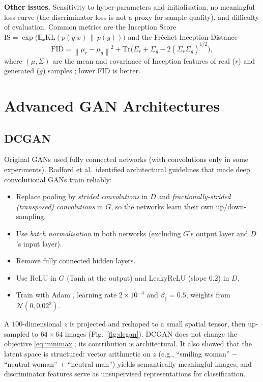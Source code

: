 \documentclass[conference]{IEEEtran}
\newcommand{\E}{\mathbb{E}}
\newcommand{\KL}{\mathrm{KL}}
\newcommand{\norm}[1]{\left\lVert #1 \right\rVert}
\theoremstyle{plain}
\theoremstyle{definition}
\begin{document}
\textbf{Other issues.} Sensitivity to hyper-parameters and initialisation, no meaningful loss curve (the discriminator loss is not a proxy for sample quality), and difficulty of evaluation. Common metrics are the Inception Score $\mathrm{IS}=\exp\big(\E_x\KL(p(y|x)\,\|\,p(y))\big)$ \cite{salimans2016improved} and the Fr\'echet Inception Distance
\begin{equation}
\mathrm{FID}=\norm{\mu_r-\mu_g}^2+\mathrm{Tr}\big(\Sigma_r+\Sigma_g-2(\Sigma_r\Sigma_g)^{1/2}\big),
\end{equation}
where $(\mu,\Sigma)$ are the mean and covariance of Inception features of real ($r$) and generated ($g$) samples \cite{heusel2017ttur}; lower FID is better.

\section{Advanced GAN Architectures}\label{sec:arch}

\subsection{DCGAN \cite{radford2016dcgan}}
Original GANs used fully connected networks (with convolutions only in some experiments). Radford et al.\ identified architectural guidelines that made deep convolutional GANs train reliably:
\begin{itemize}
\item Replace pooling by \emph{strided convolutions} in $D$ and \emph{fractionally-strided (transposed) convolutions} in $G$, so the networks learn their own up/down-sampling.
\item Use \emph{batch normalisation} \cite{ioffe2015bn} in both networks (excluding $G$'s output layer and $D$'s input layer).
\item Remove fully connected hidden layers.
\item Use ReLU in $G$ (Tanh at the output) and LeakyReLU (slope $0.2$) in $D$.
\item Train with Adam \cite{kingma2015adam}, learning rate $2\times10^{-4}$ and $\beta_1=0.5$; weights from $\mathcal{N}(0,0.02^2)$.
\end{itemize}
A $100$-dimensional $z$ is projected and reshaped to a small spatial tensor, then up-sampled to $64\times64$ images (Fig.~\ref{fig:dcgan}). DCGAN does not change the objective \eqref{eq:minimax}; its contribution is architectural. It also showed that the latent space is structured: vector arithmetic on $z$ (e.g., ``smiling woman'' $-$ ``neutral woman'' $+$ ``neutral man'') yields semantically meaningful images, and discriminator features serve as unsupervised representations for classification.
\end{document}
